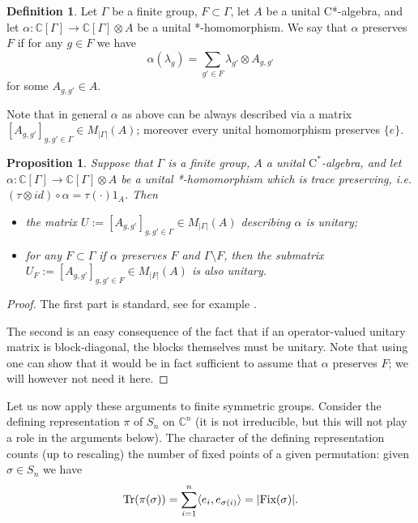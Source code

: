 \documentclass[12pt]{amsart}
\newtheorem{prop}[thm]{Proposition}
\theoremstyle{definition}
\theoremstyle{definition}
\theoremstyle{definition}
\newtheorem{defn}[thm]{Definition}
\theoremstyle{definition}
\DeclareMathOperator{\Tr}{Tr}
\newcommand{\C}{\mathbb{C}}
\newcommand{\Cst}{\textrm{C}^\ast}
\numberwithin{equation}{section}
\begin{document}
\begin{defn}
Let $\Gamma$ be a finite group, $F \subset \Gamma$, let $A$ be a unital C*-algebra, and let $\alpha:\C[\Gamma] \to \C[\Gamma] \otimes A$ be a unital *-homomorphism. We say that $\alpha$ preserves $F$ if for any $g\in F$ we have
\[ \alpha (\lambda_g) = \sum_{g' \in F} \lambda_{g'} \otimes A_{g,g'} \]
for some $A_{g,g'} \in A$.
\end{defn}

Note that in general $\alpha$ as above can be always described via a matrix $[A_{g, g'}]_{g,g' \in\Gamma}\in M_{|\Gamma|}(A)$; moreover every unital homomorphism preserves $\{e\}$.

\begin{prop}\label{prop:genformGamma}
    Suppose that $\Gamma$ is a finite group,  $A$ a unital $\Cst$-algebra, and let $\alpha:\C[\Gamma] \to \C[\Gamma] \otimes A$ be a unital *-homomorphism which is trace preserving, i.e. $(\tau \otimes id)\circ \alpha = \tau(\cdot)1_A$. Then 
    \begin{itemize}
        \item[(i)] the matrix $U:=[A_{g,g'}]_{g,g' \in\Gamma}\in M_{|\Gamma|}(A)$ describing $\alpha$ is unitary;
         \item[(ii)] for any $F \subset \Gamma$ if $\alpha$ preserves $F$ and $\Gamma \setminus F$, then the submatrix $U_F:=[A_{g,g'}]_{g,g' \in F}\in M_{|F|}(A)$ is also unitary.%
    \end{itemize}
\end{prop}
\begin{proof}
    The first part is standard, see for example \cite[Proposition 3.3.13]{ASS17}. 
    
    The second is an easy consequence of the fact that if an operator-valued unitary matrix is block-diagonal, the blocks themselves must be unitary. Note that using \cite[Theorem 3.3.8 (i)]{ASS17} one can show that it would be in fact sufficient to assume that $\alpha$ preserves $F$; we will however not need it here.  
\end{proof}

Let us now apply these arguments to finite symmetric groups. 
Consider the defining representation $\pi$ of $S_n$ on $\C^n$ (it is not irreducible, but this will not play a role in the arguments below). The character of the defining representation counts (up to rescaling) the number of fixed points of a given permutation: given $\sigma \in S_n$
we have 
\[\Tr(\pi(\sigma)) = \sum_{i=1}^n \langle e_i, e_{\sigma(i)} \rangle = |\textup{Fix}(\sigma)|.\]
\end{document}

